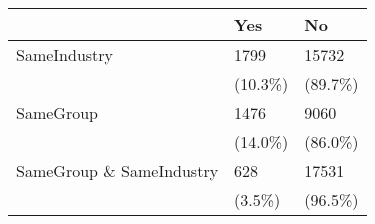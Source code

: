 \begin{tabular}{lll}
\toprule
{} &      Yes &       No \\
\midrule
SameIndustry             &     1799 &    15732 \\
                         &  (10.3\%) &  (89.7\%) \\
SameGroup                &     1476 &     9060 \\
                         &  (14.0\%) &  (86.0\%) \\
SameGroup \& SameIndustry &      628 &    17531 \\
                         &   (3.5\%) &  (96.5\%) \\
\bottomrule
\end{tabular}

